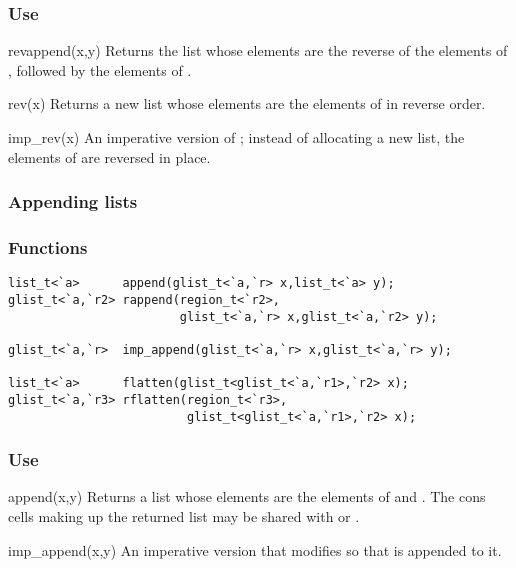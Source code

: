 \subsubsection*{Use}

\begin{defun}{revappend}{(x,y)}
Returns the list whose elements are the reverse of the elements of
, followed by the elements of .
\end{defun}

\begin{defun}{rev}{(x)}
Returns a new list whose elements are the elements of  in reverse
order.
\end{defun}

\begin{defun}{imp_rev}{(x)}
An imperative version of ; instead of allocating a new
list, the elements of  are reversed in place.
\end{defun}

\subsubsection*{Appending lists}
\subsubsection*{Functions}
\begin{verbatim}
list_t<`a>      append(glist_t<`a,`r> x,list_t<`a> y);
glist_t<`a,`r2> rappend(region_t<`r2>,
                        glist_t<`a,`r> x,glist_t<`a,`r2> y);

glist_t<`a,`r>  imp_append(glist_t<`a,`r> x,glist_t<`a,`r> y);

list_t<`a>      flatten(glist_t<glist_t<`a,`r1>,`r2> x);
glist_t<`a,`r3> rflatten(region_t<`r3>,
                         glist_t<glist_t<`a,`r1>,`r2> x);
\end{verbatim}

\subsubsection*{Use}

\begin{defun}{append}{(x,y)}
Returns a list whose elements are the elements of  and .
The cons cells making up the returned list may be shared with  or
.
\end{defun}

\begin{defun}{imp_append}{(x,y)}
An imperative version that modifies  so that  is
appended to it.
\end{defun}

